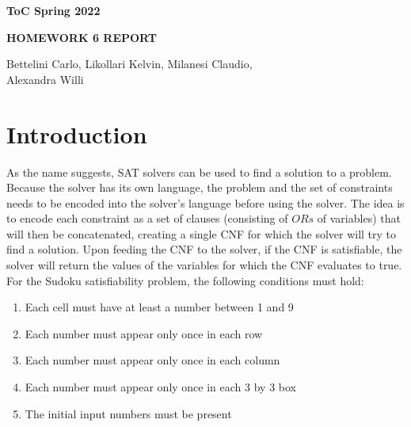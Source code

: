 \documentclass[12pt,a4paper]{article}
\begin{document}
\begin{center}

  \bigskip \bigskip

  {\large \textbf{ToC Spring 2022}}

   \bigskip


   {\large \textbf{HOMEWORK 6 REPORT}}







  \bigskip \bigskip


  {\large Bettelini Carlo, Likollari Kelvin, Milanesi Claudio, \\
  Alexandra Willi
  }

   \bigskip



  \bigskip \bigskip



  \bigskip \bigskip

\end{center}

\section*{Introduction}

As the name suggests, SAT solvers can be used to find a solution to a problem. Because the solver has its own language, the problem and the set of constraints needs to be encoded into the solver's language before using the solver.
The idea is to encode each constraint as a set of clauses (consisting of $ORs$ of variables) that will then be concatenated, creating a single CNF for which the solver will try to find a solution.
Upon feeding the CNF to the solver, if the CNF is satisfiable, the solver will return the values of the variables for which the CNF evaluates to true.
For the Sudoku satisfiability problem, the following conditions must hold:
\begin{enumerate}
  \item Each cell must have at least a number  between 1 and 9
  \item Each number must appear only once in each row
  \item Each number must appear only once in each column
  \item Each number must appear only once in each 3 by 3 box
  \item The initial input numbers must be present
\end{enumerate}
\end{document}
